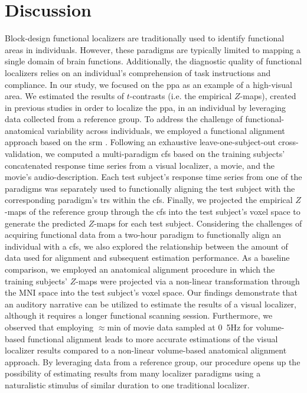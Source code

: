 \section{Discussion}

%
Block-design functional localizers are traditionally used to identify functional
areas in individuals.
%
However, these paradigms are typically limited to mapping a single domain of
brain functions.
%
Additionally, the diagnostic quality of functional localizers relies on an
individual's comprehension of task instructions and compliance.
%
In our study, we focused on the \ac{ppa} as an example of a high-visual area.
%
We estimated the results of $t$-contrasts (i.e. the empirical $Z$-maps), created
in previous studies \citep{sengupta2016extension, haeusler2022processing} in
order to localize the \ac{ppa}, in an individual by leveraging data collected
from a reference group.
%
To address the challenge of functional-anatomical variability across
individuals, we employed a functional alignment approach based on the \acf{srm}
\citep{chen2015reduced}.
%
Following an exhaustive leave-one-subject-out cross-validation, we computed a
multi-paradigm \acf{cfs} based on the training subjects' concatenated response
time series from a visual localizer, a movie, and the movie's audio-description.
%
Each test subject's response time series from one of the paradigms was
separately used to functionally aligning the test subject with the corresponding
paradigm's \acp{tr} within the \ac{cfs}.
%
Finally, we projected the empirical $Z$-maps of the reference group through the
\ac{cfs} into the test subject's voxel space to generate the predicted $Z$-maps
for each test subject.
%
Considering the challenges of acquiring functional data from a two-hour paradigm
to functionally align an individual with a \ac{cfs}, we also explored the
relationship between the amount of data used for alignment and subsequent
estimation performance.
%
As a baseline comparison, we employed an anatomical alignment procedure in which
the training subjects' $Z$-maps were projected via a non-linear transformation
through the MNI space into the test subject's voxel space.
%
Our findings demonstrate that an auditory narrative can be utilized to estimate
the results of a visual localizer, although it requires a longer functional
scanning session.
%
Furthermore, we observed that employing $\approx$\unit[15]{min} of movie data
sampled at \unit{0.5}{Hz} for volume-based functional alignment leads to more
accurate estimations of the visual localizer results compared to a non-linear
volume-based anatomical alignment approach.
%
By leveraging data from a reference group, our procedure opens up the
possibility of estimating results from many localizer paradigms using a
naturalistic stimulus of similar duration to one traditional localizer.

